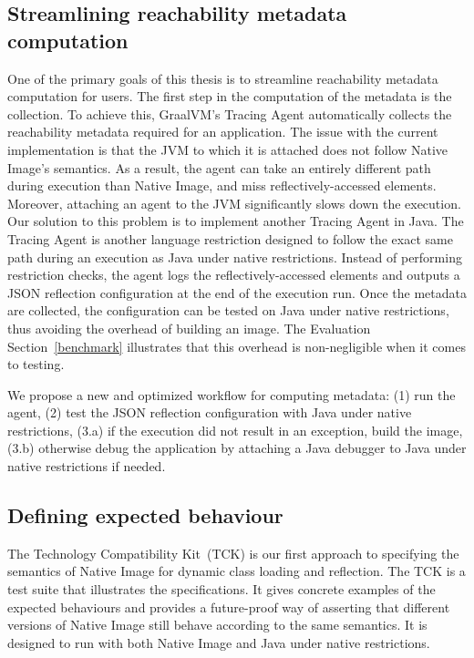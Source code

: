 \subsection{Streamlining reachability metadata computation}
One of the primary goals of this thesis is to streamline reachability metadata computation for users.
The first step in the computation of the metadata is the collection. To achieve this, GraalVM's Tracing Agent automatically collects the reachability metadata required for an application. The issue with the current implementation is that the JVM to which it is attached does not follow Native Image's semantics. As a result, the agent can take an entirely different path during execution than Native Image, and miss reflectively-accessed elements. Moreover, attaching an agent to the JVM significantly slows down the execution.
Our solution to this problem is to implement another Tracing Agent in Java. The Tracing Agent is another language restriction designed to follow the exact same path during an execution as Java under native restrictions. Instead of performing restriction checks, the agent logs the reflectively-accessed elements and outputs a JSON reflection configuration at the end of the execution run. 
Once the metadata are collected, the configuration can be tested on Java under native restrictions, thus avoiding the overhead of building an image. The Evaluation Section~\ref{benchmark} illustrates that this overhead is non-negligible when it comes to testing.  

We propose a new and optimized workflow for computing metadata: (1) run the agent, (2) test the JSON reflection configuration with Java under native restrictions, (3.a) if the execution did not result in an exception, build the image, (3.b) otherwise debug the application by attaching a Java debugger to Java under native restrictions if needed.

\subsection{Defining expected behaviour}
The Technology Compatibility Kit~(TCK) is our first approach to specifying the semantics of Native Image for dynamic class loading and reflection. The TCK is a test suite that illustrates the specifications. It gives concrete examples of the expected behaviours and provides a future-proof way of asserting that different versions of Native Image still behave according to the same semantics.
It is designed to run with both Native Image and Java under native restrictions.

